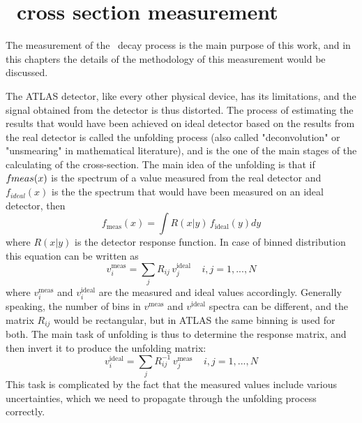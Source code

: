 \chapter{\Zee\ cross section measurement}
\label{sec:ZeeCrossSec}

The measurement of the \Zee\ decay process is the main purpose of this work, and in this chapters the details of the methodology of this measurement would be discussed.

The ATLAS detector, like every other physical device, has its limitations, and the signal obtained from the detector is thus distorted. The process of estimating the results that would have been achieved on ideal detector based on the results from the real detector is called the unfolding process (also called "deconvolution" or "unsmearing" in mathematical literature), and is the one of the main stages of the calculating of the cross-section. The main idea of the unfolding is that if $f_\mathrm\mathrm{meas}(x)$ is the spectrum of a value measured from the real detector and $f_{ideal}(x)$ is the the spectrum that would have been measured on an ideal detector, then
\begin{equation}
f_\mathrm{meas}(x) = \int R(x|y) \, f_\mathrm{ideal}(y)dy
\end{equation}
where $R(x|y)$ is the detector response function. In case of binned distribution this equation can be written as
\begin{equation}
v^\mathrm{meas}_i = \sum_j R_{ij} \, v^\mathrm{ideal}_j \:\:\:\:\: i,j = 1, ... ,N
\end{equation}
where $v^\mathrm{meas}_i$ and $v^\mathrm{ideal}_i$ are the measured and ideal values accordingly. Generally speaking, the number of bins in $v^\mathrm{meas}$ and $v^\mathrm{ideal}$ spectra can be different, and the matrix $R_{ij}$ would be rectangular, but in ATLAS the same binning is used for both. The main task of unfolding is thus to determine the response matrix, and then invert it to produce the unfolding matrix:
\begin{equation}
v^\mathrm{ideal}_i = \sum_j R^{-1}_{ij} \, v^\mathrm{meas}_j \:\:\:\:\: i,j = 1, ... ,N
\end{equation}
This task is complicated by the fact that the measured values include various uncertainties, which we need to propagate through the unfolding process correctly.

